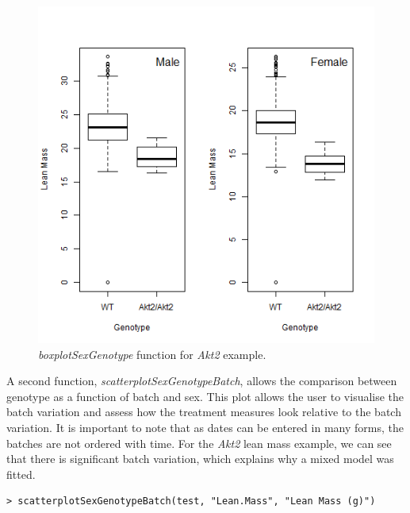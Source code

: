 \documentclass[12pt,a4paper]{article}
\begin{document}
\begin{figure}[H]%
\centerline{\includegraphics[scale=0.5]{cs1_boxplotSexGenotype.png}}
\caption{\textit{boxplotSexGenotype} function for \textit{Akt2} example.}\label{fig:15}
\end{figure}

A second function, \textit{scatterplotSexGenotypeBatch}, allows the comparison between genotype as a function of batch and sex.  
This plot allows the user to visualise the batch variation and assess how the treatment measures look relative to the batch variation. 
It is important to note that as dates can be entered in many forms, the batches are not ordered with time. 
For the \textit{Akt2} lean mass example, we can see that there is significant batch variation, which explains why a mixed model was fitted.

\begingroup
    \fontsize{8pt}{12pt}\selectfont
\begin{verbatim}
> scatterplotSexGenotypeBatch(test, "Lean.Mass", "Lean Mass (g)")
\end{verbatim}
\endgroup 
\end{document}
